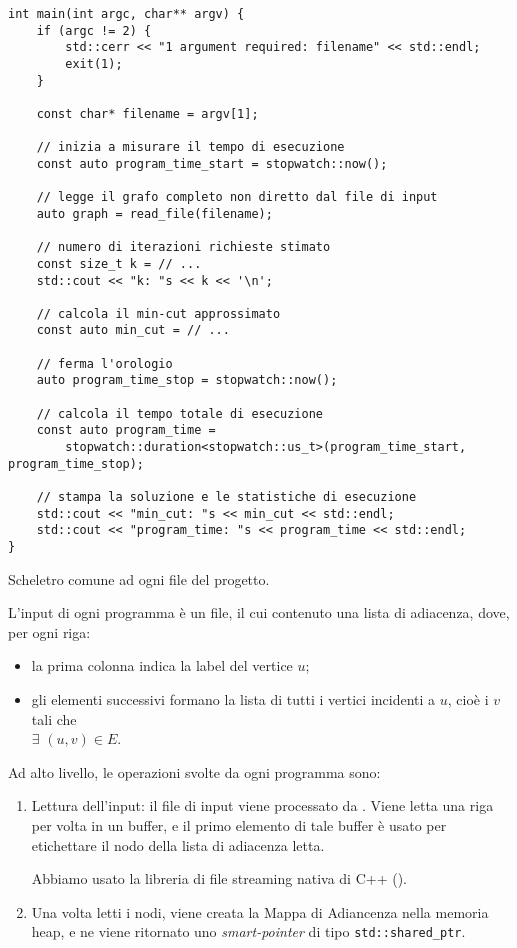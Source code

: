 \begin{listing}[!ht]
\begin{verbatim}
int main(int argc, char** argv) {
    if (argc != 2) {
        std::cerr << "1 argument required: filename" << std::endl;
        exit(1);
    }

    const char* filename = argv[1];

    // inizia a misurare il tempo di esecuzione
    const auto program_time_start = stopwatch::now();

    // legge il grafo completo non diretto dal file di input
    auto graph = read_file(filename);

    // numero di iterazioni richieste stimato
    const size_t k = // ...
    std::cout << "k: "s << k << '\n';

    // calcola il min-cut approssimato
    const auto min_cut = // ...
    
    // ferma l'orologio
    auto program_time_stop = stopwatch::now();

    // calcola il tempo totale di esecuzione
    const auto program_time =
        stopwatch::duration<stopwatch::us_t>(program_time_start, program_time_stop);

    // stampa la soluzione e le statistiche di esecuzione
    std::cout << "min_cut: "s << min_cut << std::endl;
    std::cout << "program_time: "s << program_time << std::endl;
}
\end{verbatim}
\caption{Scheletro comune ad ogni file  del progetto.}
\label{listing:main-cpp}
\end{listing}

L'input di ogni programma è un file, il cui contenuto una lista di
adiacenza, dove, per ogni riga:

\begin{itemize}
    \item la prima colonna indica la label del vertice $u$;
    \item gli elementi successivi formano la lista di tutti i vertici
      incidenti a $u$, cioè i $v$ tali che \\ $\exists$ $(u, v) \in
      E$.
\end{itemize}

\noiindet Ad alto livello, le operazioni svolte da ogni programma sono:

\begin{enumerate}
    \item Lettura dell'input: il file di input viene processato
      da . Viene letta una riga per volta in
      un buffer, e il primo elemento di tale buffer è usato per
      etichettare il nodo della lista di adiacenza letta.

    \noindent Abbiamo usato la libreria di file streaming nativa di
    C++ ().

    \item Una volta letti i nodi, viene creata la Mappa di Adiancenza
      nella memoria heap, e ne viene ritornato uno
      \textit{smart-pointer} di tipo
      \texttt{std::shared_ptr}.
\end{enumerate}

